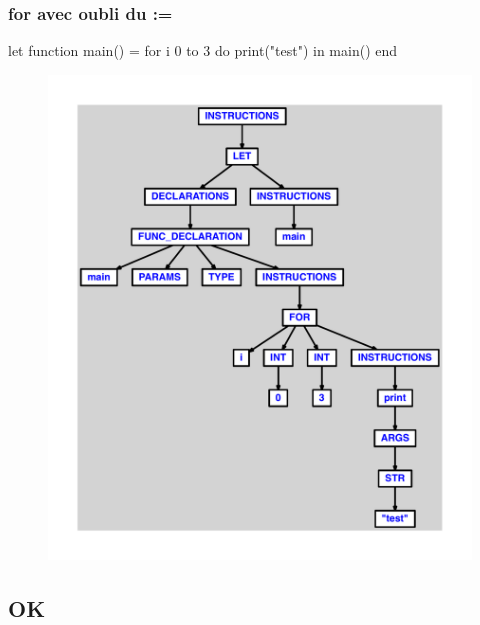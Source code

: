 \documentclass{article}
\begin{document}
\subsubsection{for avec oubli du :=}
\begin{verbatimtab}
let
	function main() =
		for i 0 to 3 do
			print("test")
in main() end
\end{verbatimtab}
\begin{figure}[H]\centering\includegraphics[max width=\textwidth]{ast/ast_195.pdf}\end{figure}\subsection{OK}
\end{document}
